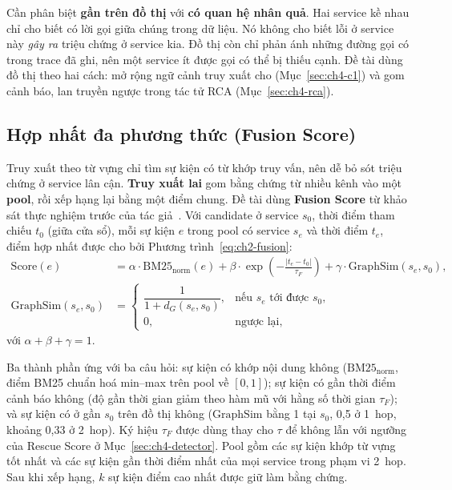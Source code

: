 Cần phân biệt \textbf{gần trên đồ thị} với \textbf{có quan hệ nhân quả}. Hai service kề nhau chỉ cho biết có lời gọi giữa chúng trong dữ liệu. Nó không cho biết lỗi ở service này \emph{gây ra} triệu chứng ở service kia. Đồ thị còn chỉ phản ánh những đường gọi có trong trace đã ghi, nên một service ít được gọi có thể bị thiếu cạnh. Đề tài dùng đồ thị theo hai cách: mở rộng ngữ cảnh truy xuất cho \CTAV{} (Mục~\ref{sec:ch4-c1}) và gom cảnh báo, lan truyền ngược trong tác tử RCA (Mục~\ref{sec:ch4-rca}).

\subsection{Hợp nhất đa phương thức (Fusion Score)}
\label{sec:ch2-fusion}

Truy xuất theo từ vựng chỉ tìm sự kiện có từ khớp truy vấn, nên dễ bỏ sót triệu chứng ở service lân cận. \textbf{Truy xuất lai} gom bằng chứng từ nhiều kênh vào một \textbf{pool}, rồi xếp hạng lại bằng một điểm chung. Đề tài dùng \textbf{Fusion Score} từ khảo sát thực nghiệm trước của tác giả~\cite{author2026icaetm}. Với candidate ở service $s_0$, thời điểm tham chiếu $t_0$ (giữa cửa sổ), mỗi sự kiện $e$ trong pool có service $s_e$ và thời điểm $t_e$, điểm hợp nhất được cho bởi Phương trình~\eqref{eq:ch2-fusion}:
\begin{align}
  \mathrm{Score}(e) &= \alpha \cdot \mathrm{BM25}_{\mathrm{norm}}(e)
    + \beta \cdot \exp\!\left(-\frac{|t_e - t_0|}{\tau_F}\right)
    + \gamma \cdot \mathrm{GraphSim}(s_e, s_0), \nonumber \\
  \mathrm{GraphSim}(s_e, s_0) &=
    \begin{cases}
      \dfrac{1}{1 + d_G(s_e, s_0)}, & \text{nếu } s_e \text{ tới được } s_0, \\[8pt]
      0, & \text{ngược lại,}
    \end{cases}
  \label{eq:ch2-fusion}
\end{align}
với $\alpha + \beta + \gamma = 1$.

Ba thành phần ứng với ba câu hỏi: sự kiện có khớp nội dung không ($\mathrm{BM25}_{\mathrm{norm}}$, điểm BM25 chuẩn hoá min--max trên pool về $[0, 1]$); sự kiện có gần thời điểm cảnh báo không (độ gần thời gian giảm theo hàm mũ với hằng số thời gian $\tau_F$); và sự kiện có ở gần $s_0$ trên đồ thị không ($\mathrm{GraphSim}$ bằng 1 tại $s_0$, 0,5 ở 1~hop, khoảng 0,33 ở 2~hop). Ký hiệu $\tau_F$ được dùng thay cho $\tau$ để không lẫn với ngưỡng của Rescue Score ở Mục~\ref{sec:ch4-detector}. Pool gồm các sự kiện khớp từ vựng tốt nhất và các sự kiện gần thời điểm nhất của mọi service trong phạm vi 2~hop. Sau khi xếp hạng, $k$ sự kiện điểm cao nhất được giữ làm bằng chứng.

